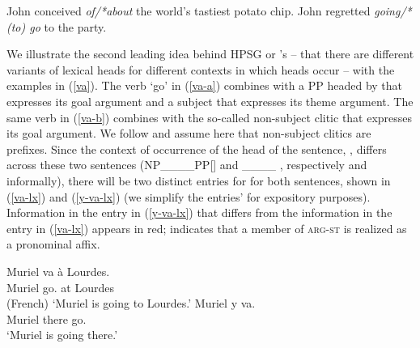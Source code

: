 \documentclass[output=paper,biblatex,babelshorthands,newtxmath,draftmode,colorlinks,citecolor=brown]{langscibook}
\begin{document}
\eal
\label{select}
\ex\label{select-a}John conceived \emph{of/*about} the world's tastiest potato chip.
\ex\label{select-b} John regretted \emph{going/*(to) go} to the party.
\zl


\noindent
We illustrate the second leading idea behind HPSG or \lfg's\indexlfg {} -- that there
are different variants of lexical heads for different contexts in which heads occur -- with the
 examples in (\ref{va}). The verb  `go' in (\ref{va-a}) combines with a PP
headed by  that expresses its goal argument and a subject that expresses its theme
argument. The same verb in (\ref{va-b}) combines with the so-called non-subject clitic
 that expresses its goal argument. We follow \citet{MillerandSag1997} and assume here that
 non-subject clitics are prefixes. Since the context of occurrence of the head of the
sentence, , differs across these two sentences (\textsc{NP\_\_\_\_PP}[] and
 \_\_\_\_ , respectively and informally), there will be two distinct entries for
 for both sentences, shown in (\ref{va-lx}) and (\ref{y-va-lx}) (we simplify the
entries'  for expository purposes). Information in the entry in
(\ref{y-va-lx}) that differs from the information in the entry in (\ref{va-lx}) appears in red;
 indicates that a member of \textsc{arg-st} is realized as a pronominal affix. 

\eal
\label{va}
\ex\label{va-a} 
\gll Muriel va à Lourdes. \\
     Muriel go. at Lourdes \\\hfill(French)
     \glt `Muriel is going to Lourdes.'
\ex\label{va-b}
\gll Muriel y va. \\
     Muriel there go. \\
 \glt `Muriel is going there.'
\zl

\ea
\label{va-lx}
\z
\end{document}
